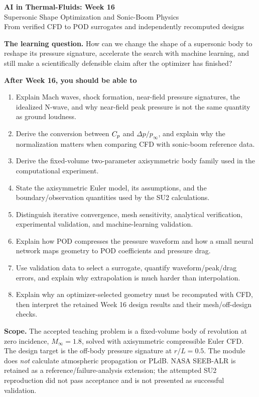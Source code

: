 

\begin{center}
{\color{accent}\LARGE\bfseries AI in Thermal-Fluids: Week 16}\\[7pt]
{\Large Supersonic Shape Optimization and Sonic-Boom Physics}\\[5pt]
{\large From verified CFD to POD surrogates and independently recomputed designs}
\end{center}

\vspace{6pt}
\textbf{The learning question.} How can we change the shape of a supersonic body to reshape its pressure signature, accelerate the search with machine learning, and still make a scientifically defensible claim after the optimizer has finished?

\textbf{After Week 16, you should be able to}
\begin{enumerate}
\item Explain Mach waves, shock formation, near-field pressure signatures, the idealized N-wave, and why near-field peak pressure is not the same quantity as ground loudness.
\item Derive the conversion between $C_p$ and $\Delta p/p_\infty$, and explain why the normalization matters when comparing CFD with sonic-boom reference data.
\item Derive the fixed-volume two-parameter axisymmetric body family used in the computational experiment.
\item State the axisymmetric Euler model, its assumptions, and the boundary/observation quantities used by the SU2 calculations.
\item Distinguish iterative convergence, mesh sensitivity, analytical verification, experimental validation, and machine-learning validation.
\item Explain how POD compresses the pressure waveform and how a small neural network maps geometry to POD coefficients and pressure drag.
\item Use validation data to select a surrogate, quantify waveform/peak/drag errors, and explain why extrapolation is much harder than interpolation.
\item Explain why an optimizer-selected geometry must be recomputed with CFD, then interpret the retained Week 16 design results and their mesh/off-design checks.
\end{enumerate}

\textbf{Scope.} The accepted teaching problem is a fixed-volume body of revolution at zero incidence, $M_\infty=1.8$, solved with axisymmetric compressible Euler CFD. The design target is the off-body pressure signature at $r/L=0.5$. The module does \emph{not} calculate atmospheric propagation or PLdB. NASA SEEB-ALR is retained as a reference/failure-analysis extension; the attempted SU2 reproduction did not pass acceptance and is not presented as successful validation.

